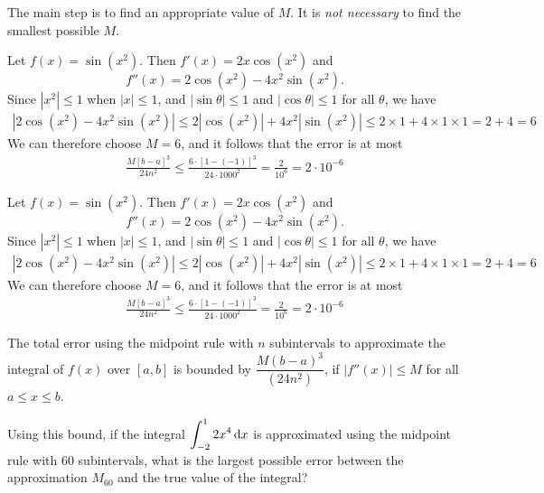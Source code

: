 \begin{hint}
The main step is to find an appropriate value of $M$. It is \emph{not necessary} to
find the smallest possible $M$.
\end{hint}

\begin{answer}
Let $f(x) = \sin(x^2)$.  Then $f'(x) = 2x \cos(x^2)$ and
$$f''(x) = 2\cos(x^2) - 4x^2\sin(x^2).$$
Since $|x^2|\le1$ when $|x|\leq 1$, and $\left|\sin\theta\right|\le1$ and $\left|\cos\theta\right|\leq 1$ for all $\theta$,
we have
\begin{align*}
\left|2\cos(x^2) - 4x^2\sin(x^2)\right|
\le 2|\cos(x^2)| +  4x^2|\sin(x^2)|
\le 2\times 1 +4\times 1\times 1
= 2+4 = 6
\end{align*}
We can therefore choose $M=6$, and it follows that the error is at most \begin{align*}
\frac{M[b-a]^3}{24n^2}
\le \frac{6\cdot [1-(-1)]^3}{24 \cdot 1000^2}
= \frac{2}{10^6}  = 2\cdot 10^{-6}
\end{align*}\end{answer}

\begin{solution}
Let $f(x) = \sin(x^2)$.  Then $f'(x) = 2x \cos(x^2)$ and
$$f''(x) = 2\cos(x^2) - 4x^2\sin(x^2).$$
Since $|x^2|\le1$ when $|x|\leq 1$, and $\left|\sin\theta\right|\le1$ and $\left|\cos\theta\right|\leq 1$ for all $\theta$,
we have
\begin{align*}
\left|2\cos(x^2) - 4x^2\sin(x^2)\right|
\le 2|\cos(x^2)| +  4x^2|\sin(x^2)|
\le 2\times 1 +4\times 1\times 1
= 2+4 = 6
\end{align*}
We can therefore choose $M=6$, and it follows that the error is at most \begin{align*}
\frac{M[b-a]^3}{24n^2}
\le \frac{6\cdot [1-(-1)]^3}{24 \cdot 1000^2}
= \frac{2}{10^6}  = 2\cdot 10^{-6}
\end{align*}
\end{solution}


\begin{Mquestion}[2016Q4]
The total error using the midpoint rule with $n$ subintervals to
approximate the integral of $f(x)$ over $[a,b]$ is bounded by
$\dfrac{M (b-a)^3}{(24n^2)}$, if $|f''(x)| \le M$ for all  $a \le x \le b$.

Using this bound, if the integral $\displaystyle\int_{-2}^{1} 2x^4 \,\mathrm{d}x$ is approximated using the midpoint rule with $60$ subintervals, what is the largest possible error between the approximation $M_{60}$ and the true value of the integral?
\end{Mquestion}


